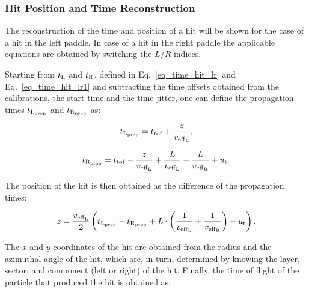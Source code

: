 \documentclass[3p,times,twocolumn]{elsarticle}
\begin{document}
%
%

\subsubsection{Hit Position and Time Reconstruction}

The reconstruction of the time and position of a hit will be shown for the case of a hit in the left paddle. In
case of a hit in the right paddle the applicable equations are obtained by switching the $L/R$ indices.

Starting from $t_{\rm{L}}$ and $t_{\rm{R}}$, defined in Eq.~\ref{eq_time_hit_lr} and Eq.~\ref{eq_time_hit_lr1}
and subtracting the time offsets obtained from the calibrations, the start time and the time jitter, one can
define the propagation times $t_{\rm{L}_{\rm{prop}}}$ and $t_{\rm{R}_{\rm{prop}}}$ as:

\begin{equation}
t_{\rm{L}_{\rm{prop}}}=t_{\rm{tof}}+\frac{z}{v_{\rm{eff}_{\rm{L}}}},
\end{equation}

\begin{equation}
t_{\rm{R}_{\rm{prop}}}=t_{\rm{tof}}-\frac{z}{v_{\rm{eff}_{\rm{L}}}}+\frac{L}{v_{\rm{eff}_{\rm{L}}}}
+\frac{L}{v_{\rm{eff}_{\rm{R}}}}+u_{\rm{t}}.
\end{equation}

The position of the hit is then obtained as the difference of the propagation times:

\begin{equation}
z=\frac{v_{\rm{eff}_{\rm{L}}}}{2} \left(t_{\rm{L}_{\rm{prop}}}-t_{\rm{R}_{\rm{prop}}}
+ L \cdot \left(\frac{1}{v_{\rm{eff}_{\rm{L}}}}+\frac{1}{v_{\rm{eff}_{\rm{R}}}}\right)  +u_{\rm{t}}\right).
\end{equation}

The $x$ and $y$ coordinates of the hit are obtained from the radius and the azimuthal angle of the hit, which
are, in turn, determined by knowing the layer, sector, and component (left or right) of the hit.  Finally, the time
of flight of the particle that produced the hit is obtained as:
\end{document}
